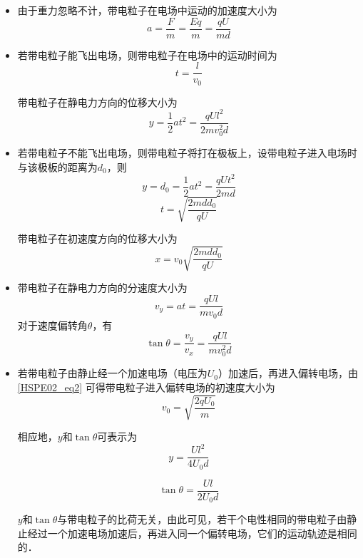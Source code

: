 \begin{itemize}
\item 由于重力忽略不计，带电粒子在电场中运动的加速度大小为
\begin{equation}
a = \frac{F}{m} = \frac{Eq}{m} = \frac{qU}{md}
\end{equation}

\item 若带电粒子能飞出电场，则带电粒子在电场中的运动时间为
\begin{equation}
t = \frac{l}{v_0}
\end{equation}

带电粒子在静电力方向的位移大小为
\begin{equation}
y = \frac12 at^2 = \frac{qUl^2}{2mv_0^2 d}
\end{equation}

\item 若带电粒子不能飞出电场，则带电粒子将打在极板上，设带电粒子进入电场时与该极板的距离为$d_0$，则
\begin{equation}
y = d_0 = \frac12 at^2 = \frac{qUt^2}{2md}
\end{equation}
\begin{equation}
t = \sqrt{\frac{2mdd_0}{qU}}
\end{equation}

带电粒子在初速度方向的位移大小为
\begin{equation}
x = v_0\sqrt{\frac{2mdd_0}{qU}}
\end{equation}

\item 带电粒子在静电力方向的分速度大小为
\begin{equation}
v_y = at = \frac{qUl}{mv_0d}
\end{equation}
对于速度偏转角$\theta$，有
\begin{equation}
\tan \theta = \frac{v_y}{v_x} = \frac{qUl}{mv_0^2 d}
\end{equation}

\item 若带电粒子由静止经一个加速电场（电压为$U_0$）加速后，再进入偏转电场，由\autoref{HSPE02_eq2} 可得带电粒子进入偏转电场的初速度大小为
\begin{equation}
v_0 = \sqrt{\frac{2qU_0}{m}}
\end{equation}

相应地，$y$和$\tan\theta$可表示为
\begin{equation}
y = \frac{Ul^2}{4U_0d}
\end{equation}

\begin{equation}
\tan\theta = \frac{Ul}{2U_0d}
\end{equation}

$y$和$\tan\theta$与带电粒子的比荷无关，由此可见，若干个电性相同的带电粒子由静止经过一个加速电场加速后，再进入同一个偏转电场，它们的运动轨迹是相同的．
\end{itemize}

